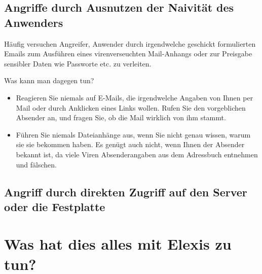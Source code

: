 \subsection{Angriffe durch Ausnutzen der Naivität des Anwenders}

Häufig versuchen Angreifer, Anwender durch irgendwelche geschickt formulierten Emails zum Ausführen eines virenverseuchten Mail-Anhangs oder
zur Preisgabe sensibler Daten wie Passworte etc. zu verleiten.

Was kann man dagegen tun?

\begin{itemize}
    \item{Reagieren Sie niemals auf E-Mails, die irgendwelche Angaben von Ihnen per Mail oder durch Anklicken eines Links wollen.
    Rufen Sie den vorgeblichen Absender an, und fragen Sie, ob die Mail wirklich von ihm stammt.}
    \item{Führen Sie niemals Dateianhänge aus, wenn Sie nicht genau wissen, warum sie sie bekommen haben. Es genügt auch nicht, wenn Ihnen der
    Absender bekannt ist, da viele Viren Absenderangaben aus dem Adressbuch entnehmen und fälschen.}
\end{itemize}

\subsection{Angriff durch direkten Zugriff auf den Server oder die Festplatte}


\section{Was hat dies alles mit Elexis zu tun?}

